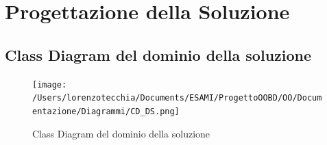 \chapter{Progettazione della Soluzione}
\section{Class Diagram del dominio della soluzione}
	\begin{figure}[hbt]
	\centering
  \texttt{[image: /Users/lorenzotecchia/Documents/ESAMI/ProgettoOOBD/OO/Documentazione/Diagrammi/CD\_DS.png]}
  \caption{Class Diagram del dominio della soluzione}
\end{figure}


